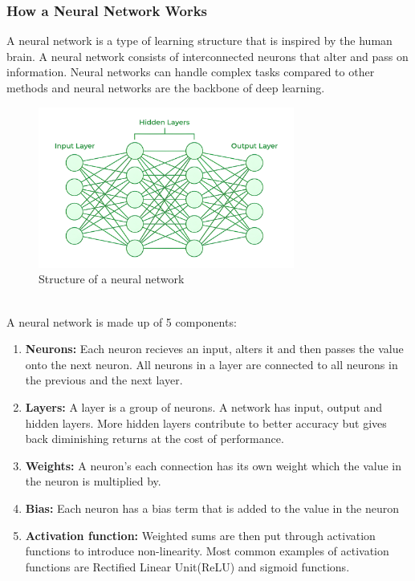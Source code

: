 \subsubsection{How a Neural Network Works}\label{sec:521}
A neural network is a type of learning structure that is inspired by the human brain. A neural network consists of interconnected neurons that alter and pass on information. Neural networks can handle complex tasks compared to other methods and neural networks are the backbone of deep learning.\\
\begin{figure}[hbt!]
\begin{center}
\includegraphics[width=0.75\textwidth]{Bilder/Neural-Networks-Architecture.png}
\caption{ Structure of a neural network\cite{gfgneural}}\label{fig:neural}
\end{center}
\end{figure}\\
A neural network is made up of 5 components:
\begin{enumerate}
    \item \textbf{Neurons:} Each neuron recieves an input, alters it and then passes the value onto the next neuron. All neurons in a layer are connected to all neurons in the previous and the next layer.
    \item \textbf{Layers:} A layer is a group of neurons. A network has input, output and hidden layers. More hidden layers contribute to better accuracy but gives back diminishing returns at the cost of performance.
    \item \textbf{Weights:} A neuron's each connection has its own weight which the value in the neuron is multiplied by.
    \item \textbf{Bias:} Each neuron has a bias term that is added to the value in the neuron
    \item \textbf{Activation function:} Weighted sums are then put through activation functions to introduce non-linearity. Most common examples of activation functions are Rectified Linear Unit(ReLU) and sigmoid functions.
\end{enumerate}
